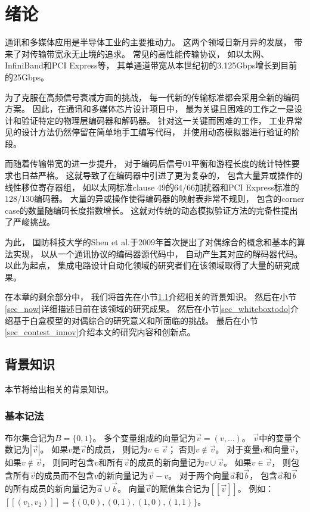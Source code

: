 \chapter{绪论}
\label{chap:1}

通讯和多媒体应用是半导体工业的主要推动力。
这两个领域日新月异的发展，
带来了对传输带宽永无止境的追求。
常见的高性能传输协议，
如以太网、InfiniBand和PCI Express等，
其单通道带宽从本世纪初的3.125Gbps增长到目前的25Gbps。

为了克服在高频信号衰减方面的挑战，
每一代新的传输标准都会采用全新的编码方案。
因此，在通讯和多媒体芯片设计项目中，
最为关键且困难的工作之一是设计和验证特定的物理层编码器和解码器。
针对这一关键而困难的工作，
工业界常见的设计方法仍然停留在简单地手工编写代码，
并使用动态模拟器进行验证的阶段。

而随着传输带宽的进一步提升，
对于编码后信号01平衡和游程长度的统计特性要求也日益严格。
这就导致了在编码器中引进了更为复杂的，
包含大量异或操作的线性移位寄存器组，
如以太网标准clause 49的64/66加扰器和PCI Express标准的128/130编码器。
大量的异或操作使得编码器的映射表非常不规则，
包含的corner case的数量随编码长度指数增长。
这就对传统的动态模拟验证方法的完备性提出了严峻挑战。

为此，
国防科技大学的Shen et al.于2009年首次提出了对偶综合的概念和基本的算法实现，
以从一个通讯协议的编码器源代码中，
自动产生其对应的解码器代码。
以此为起点，
集成电路设计自动化领域的研究者们在该领域取得了大量的研究成果。

在本章的剩余部分中，
我们将首先在小节\ref{sec_back}介绍相关的背景知识。
然后在小节\ref{sec_now}详细描述目前在该领域的研究成果。
然后在小节\ref{sec_whiteboxtodo}介绍基于白盒模型的对偶综合的研究意义和所面临的挑战。
最后在小节\ref{sec_contest_innov}介绍本文的研究内容和创新点。

\section{背景知识}\label{sec_back}
本节将给出相关的背景知识。

\subsection{基本记法}
布尔集合记为$B=\{0,1\}$。
多个变量组成的向量记为$\vec{v}=(v,\dots)$。
$\vec{v}$中的变量个数记为$|\vec{v}|$。
如果$v$是$\vec{v}$的成员，
则记为$v\in\vec{v}$；
否则$v\notin\vec{v}$。
对于变量$v$和向量$\vec{v}$，
如果$v\notin\vec{v}$，
则同时包含$v$和所有$\vec{v}$的成员的新向量记为$v\cup\vec{v}$。
如果$v\in \vec{v}$，
则包含所有$\vec{v}$的成员而不包含$v$的新向量记为$\vec{v}-v$。
对于两个向量$\vec{a}$和$\vec{b}$，
包含$\vec{a}$和$\vec{b}$的所有成员的新向量记为$\vec{a}\cup\vec{b}$。
向量$\vec{v}$的赋值集合记为$[\![\vec{v}]\!]$。
例如：
$[\![(v_1,v_2)]\!]=\{(0,0),(0,1),(1,0),(1,1)\}$。

